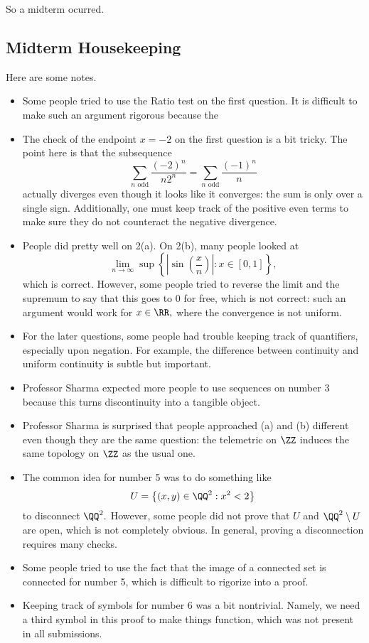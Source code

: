 \documentclass[../notes.tex]{subfiles}
\begin{document}















So a midterm ocurred.

\subsection{Midterm Housekeeping}
Here are some notes.
\begin{itemize}
	\item Some people tried to use the Ratio test on the first question. It is difficult to make such an argument rigorous because the 
	\item The check of the endpoint $x=-2$ on the first question is a bit tricky. The point here is that the subsequence
	\[\sum_{n\text{ odd}}\frac{(-2)^n}{n2^n}=\sum_{n\text{ odd}}\frac{(-1)^n}n\]
	actually diverges even though it looks like it converges: the sum is only over a single sign. Additionally, one must keep track of the positive even terms to make sure they do not counteract the negative divergence.
	\item People did pretty well on 2(a). On 2(b), many people looked at
	\[\lim_{n\to\infty}\sup\left\{\left|\sin\left(\frac xn\right)\right|:x\in[0,1]\right\},\]
	which is correct. However, some people tried to reverse the limit and the supremum to say that this goes to $0$ for free, which is not correct: such an argument would work for $x\in\RR,$ where the convergence is not uniform.
	\item For the later questions, some people had trouble keeping track of quantifiers, especially upon negation. For example, the difference between continuity and uniform continuity is subtle but important.
	\item Professor Sharma expected more people to use sequences on number 3 because this turns discontinuity into a tangible object.
	\item Professor Sharma is surprised that people approached (a) and (b) different even though they are the same question: the telemetric on $\ZZ$ induces the same topology on $\ZZ$ as the usual one.
	\item The common idea for number 5 was to do something like
	\[U=\left\{(x,y)\in\QQ^2:x^2<2\right\}\]
	to disconnect $\QQ^2.$ However, some people did not prove that $U$ and $\QQ^2\setminus U$ are open, which is not completely obvious. In general, proving a disconnection requires many checks.
	\item Some people tried to use the fact that the image of a connected set is connected for number 5, which is difficult to rigorize into a proof.
	\item Keeping track of symbols for number 6 was a bit nontrivial. Namely, we need a third symbol in this proof to make things function, which was not present in all submissions.
\end{itemize}
\end{document}
